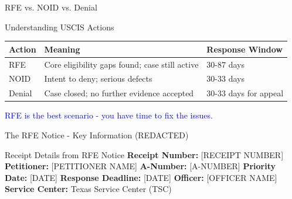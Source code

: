 \documentclass[11pt]{beamer}
\begin{document}
	\begin{frame}{RFE vs. NOID vs. Denial}
		\scriptsize
		\begin{block}{Understanding USCIS Actions}
			\centering
			\begin{tabular}{|p{3cm}|p{5cm}|p{2.5cm}|}
				\hline
				\textbf{Action} & \textbf{Meaning} & \textbf{Response Window} \\
				\hline
				RFE & Core eligibility gaps found; case still active & 30-87 days \\
				\hline
				NOID & Intent to deny; serious defects & 30-33 days \\
				\hline
				Denial & Case closed; no further evidence accepted & 30-33 days for appeal \\
				\hline
			\end{tabular}
			\vspace{0.2cm}
			\textcolor{blue}{RFE is the best scenario - you have time to fix the issues.}
		\end{block}
	\end{frame}
	
	
	\begin{frame}{The RFE Notice - Key Information (REDACTED)}
		\scriptsize
		\begin{block}{Receipt Details from RFE Notice}
			\textbf{Receipt Number:} [RECEIPT NUMBER]
			\vspace{0.2cm}
			\textbf{Petitioner:} [PETITIONER NAME]
			\vspace{0.2cm}
			\textbf{A-Number:} [A-NUMBER]
			\vspace{0.2cm}
			\textbf{Priority Date:} [DATE]
			\vspace{0.2cm}
			\textbf{Response Deadline:} [DATE]
			\vspace{0.2cm}
			\textbf{Officer:} [OFFICER NAME]
			\vspace{0.2cm}
			\textbf{Service Center:} Texas Service Center (TSC)
		\end{block}
	\end{frame}
	
\end{document}
